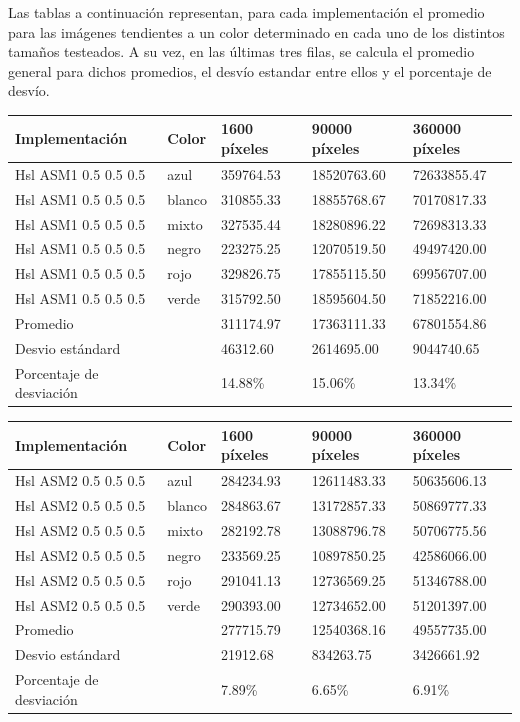 Las tablas a continuación representan, para cada implementación el promedio para las imágenes tendientes a un color determinado en cada uno de los distintos tamaños testeados. A su vez, en las últimas tres filas, se calcula el promedio general para dichos promedios, el desvío estandar entre ellos y el porcentaje de desvío.

\begin{tabular}{| l | l | l | l | l |}
\hline
Implementación & Color & 1600 píxeles & 90000 píxeles & 360000 píxeles\\
\hline
Hsl ASM1 0.5 0.5 0.5 & azul & 359764.53 & 18520763.60 & 72633855.47\\ 
\hline
Hsl ASM1 0.5 0.5 0.5 & blanco & 310855.33 & 18855768.67 & 70170817.33\\ 
\hline
Hsl ASM1 0.5 0.5 0.5 & mixto & 327535.44 & 18280896.22 & 72698313.33\\ 
\hline
Hsl ASM1 0.5 0.5 0.5 & negro & 223275.25 & 12070519.50 & 49497420.00\\
\hline
Hsl ASM1 0.5 0.5 0.5 & rojo & 329826.75 & 17855115.50 & 69956707.00\\
\hline
Hsl ASM1 0.5 0.5 0.5 & verde & 315792.50 & 18595604.50 & 71852216.00\\ 
\hline
Promedio & &  311174.97 & 17363111.33 & 67801554.86\\
\hline
Desvio estándard  && 46312.60 & 2614695.00  & 9044740.65\\
\hline
Porcentaje de desviación  && 14.88\% & 15.06\% & 13.34\%\\
\hline
\end{tabular}

\begin{tabular}{| l | l | l | l | l |}
\hline
Implementación & Color & 1600 píxeles & 90000 píxeles & 360000 píxeles\\
\hline
Hsl ASM2 0.5 0.5 0.5 & azul & 284234.93 & 12611483.33 & 50635606.13\\ 
\hline
Hsl ASM2 0.5 0.5 0.5 & blanco & 284863.67 & 13172857.33 & 50869777.33\\ 
\hline
Hsl ASM2 0.5 0.5 0.5 & mixto & 282192.78 & 13088796.78 & 50706775.56\\ 
\hline
Hsl ASM2 0.5 0.5 0.5 & negro & 233569.25 & 10897850.25 & 42586066.00\\
\hline
Hsl ASM2 0.5 0.5 0.5 & rojo & 291041.13 & 12736569.25 & 51346788.00\\
\hline
Hsl ASM2 0.5 0.5 0.5 & verde & 290393.00 & 12734652.00 & 51201397.00\\ 
\hline
Promedio & &  277715.79 & 12540368.16 & 49557735.00\\
\hline
Desvio estándard  &&  21912.68 & 834263.75 & 3426661.92\\
\hline
Porcentaje de desviación  &&  7.89\% &  6.65\% &  6.91\%\\
\hline
\end{tabular}

